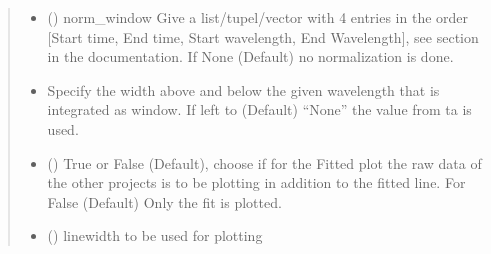 \documentclass[letterpaper,10pt,english]{sphinxmanual}
\begin{document}
\begin{fulllineitems}
\begin{fulllineitems}
\begin{quote}
\begin{description}
\begin{itemize}
\item {} 
 (\sphinxstyleliteralemphasis{\sphinxupquote{ (}}\sphinxstyleliteralemphasis{\sphinxupquote{)}}\sphinxstyleliteralemphasis{\sphinxupquote{, }}) \textendash{} norm\_window Give a list/tupel/vector with 4 entries in the order
{[}Start \sphinxhyphen{} time, End \sphinxhyphen{} time, Start \sphinxhyphen{} wavelength, End \sphinxhyphen{} Wavelength{]},
see section {\hyperref[\detokenize{Comparing:normalization-and-scaling}]{}} in the documentation.
If None (Default) no normalization is done.

\item {} 
 \textendash{} Specify the width above and below the given wavelength that is
integrated as window. If left to (Default) “None” the value from ta is
used.

\item {} 
 (\sphinxstyleliteralemphasis{\sphinxupquote{, }}) \textendash{} True or False (Default), choose if for the Fitted plot the raw data of the
other projects is to be plotting in addition to the fitted line. For False (Default)
Only the fit is plotted.

\item {} 
 (\sphinxstyleliteralemphasis{\sphinxupquote{, }}) \textendash{} linewidth to be used for plotting


\end{itemize}
\end{description}
\end{quote}
\end{fulllineitems}
\end{fulllineitems}
\end{document}
